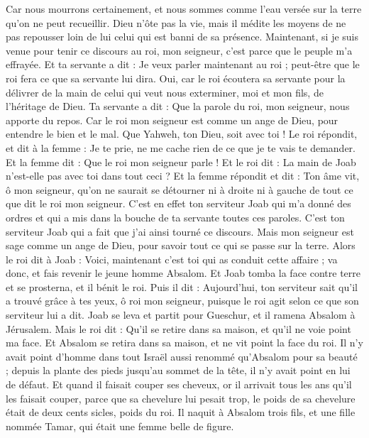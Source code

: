\begin{multicols}{2}
Car nous mourrons certainement, et nous sommes comme l’eau versée sur la terre qu’on ne peut recueillir. Dieu n’ôte pas la vie, mais il médite les moyens de ne pas repousser loin de lui celui qui est banni de sa présence.
Maintenant, si je suis venue pour tenir ce discours au roi, mon seigneur, c’est parce que le peuple m'a effrayée. Et ta servante a dit : Je veux parler maintenant au roi ; peut-être que le roi fera ce que sa servante lui dira.
Oui, car le roi écoutera sa servante pour la délivrer de la main de celui qui veut nous exterminer, moi et mon fils, de l'héritage de Dieu.
Ta servante a dit : Que la parole du roi, mon seigneur, nous apporte du repos. Car le roi mon seigneur est comme un ange de Dieu, pour entendre le bien et le mal. Que Yahweh, ton Dieu, soit avec toi !
Le roi répondit, et dit à la femme : Je te prie, ne me cache rien de ce que je te vais te demander. Et la femme dit : Que le roi mon seigneur parle !
Et le roi dit : La main de Joab n’est-elle pas avec toi dans tout ceci ? Et la femme répondit et dit : Ton âme vit, ô mon seigneur, qu'on ne saurait se détourner ni à droite ni à gauche de tout ce que dit le roi mon seigneur. C’est en effet ton serviteur Joab qui m’a donné des ordres et qui a mis dans la bouche de ta servante toutes ces paroles.
C'est ton serviteur Joab qui a fait que j’ai ainsi tourné ce discours. Mais mon seigneur est sage comme un ange de Dieu, pour savoir tout ce qui se passe sur la terre.
Alors le roi dit à Joab : Voici, maintenant c’est toi qui as conduit cette affaire ; va donc, et fais revenir le jeune homme Absalom.
Et Joab tomba la face contre terre et se prosterna, et il bénit le roi. Puis il dit : Aujourd'hui, ton serviteur sait qu'il a trouvé grâce à tes yeux, ô roi mon seigneur, puisque le roi agit selon ce que son serviteur lui a dit.
Joab se leva et partit pour Gueschur, et il ramena Absalom à Jérusalem.
Mais le roi dit : Qu'il se retire dans sa maison, et qu'il ne voie point ma face. Et Absalom se retira dans sa maison, et ne vit point la face du roi.
Il n'y avait point d'homme dans tout Israël aussi renommé qu'Absalom pour sa beauté ; depuis la plante des pieds jusqu'au sommet de la tête, il n'y avait point en lui de défaut.
Et quand il faisait couper ses cheveux, or il arrivait tous les ans qu’il les faisait couper, parce que sa chevelure lui pesait trop, le poids de sa chevelure était de deux cents sicles, poids du roi.
Il naquit à Absalom trois fils, et une fille nommée Tamar, qui était une femme belle de figure.

\end{multicols}
